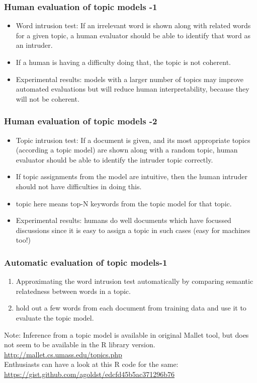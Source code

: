 \documentclass{beamer}
\begin{document}
\begin{frame}
\frametitle{Human evaluation of topic models -1}
\begin{itemize}
\item Word intrusion test: If an irrelevant word is shown along with related words for a given topic, a human evaluator should be able to identify that word as an intruder. \pause
\item If a human is having a difficulty doing that, the topic is not coherent. \pause
\item Experimental results: models with a larger number of topics may improve automated evaluations but will reduce human interpretability, because they will not be coherent.
\end{itemize}
\end{frame}

\begin{frame}
\frametitle{Human evaluation of topic models -2}
\begin{itemize}
\item Topic intrusion test: If a document is given, and its most appropriate topics (according a topic model) are shown along with a random topic, human evaluator should be able to identify the intruder topic correctly. \pause
\item If topic assignments from the model are intuitive, then the human intruder should not have difficulties in doing this. \pause
\item topic here means top-N keywords from the topic model for that topic. \pause
\item Experimental results: humans do well documents which have focussed discussions since it is easy to assign a topic in such cases (easy for machines too!) 
\end{itemize}
\end{frame}

\begin{frame}
\frametitle{Automatic evaluation of topic models-1}
\begin{enumerate}
\item Approximating the word intrusion test automatically by comparing semantic relatedness between words in a topic. \pause 
\item hold out a few words from each document from training data and use it to evaluate the topic model. 
\end{enumerate}
Note: Inference from a topic model is available in original Mallet tool, but does not seem to be available in the R library version. \\ \url{http://mallet.cs.umass.edu/topics.php}
\\ Enthusiasts can have a look at this R code for the same: \\ \url{https://gist.github.com/agoldst/edcfd45b5ac371296b76}
\end{frame}
\end{document}
